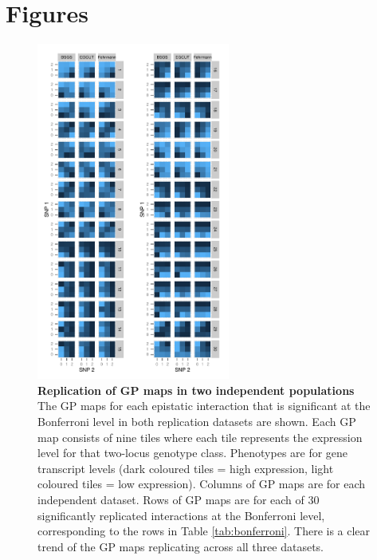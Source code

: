 \documentclass{article}
\begin{document}
\clearpage
\section*{Figures}

\begin{figure}[H]
	\centering
	\includegraphics[width=2.5in]{gpbonfrep.pdf}
	\caption{\textbf{Replication of GP maps in two independent populations} The GP maps for each epistatic interaction that is significant at the Bonferroni level in both replication datasets are shown. Each GP map consists of nine tiles where each tile represents the expression level for that two-locus genotype class. Phenotypes are for gene transcript levels (dark coloured tiles = high expression, light coloured tiles = low expression). Columns of GP maps are for each independent dataset. Rows of GP maps are for each of 30 significantly replicated interactions at the Bonferroni level, corresponding to the rows in Table \ref{tab:bonferroni}. There is a clear trend of the GP maps replicating across all three datasets.}
	\label{fig:gpmaps}
\end{figure}
\end{document}
